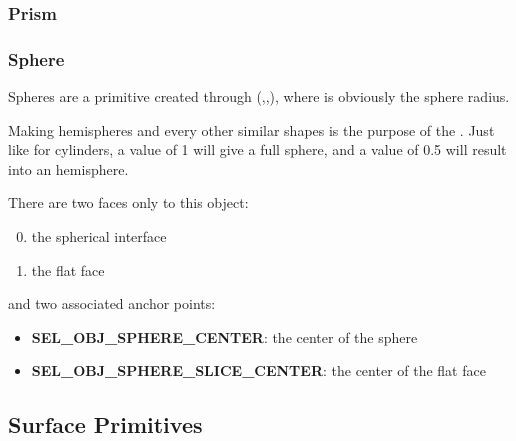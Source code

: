 \newpage
\subsubsection{Prism}

\newpage
\subsubsection{Sphere}

Spheres are a primitive created through (,,), where  is obviously the sphere radius.

Making hemispheres and every other similar shapes is the purpose of the . Just like for cylinders, a value of 1 will give a full sphere, and a value of 0.5 will result into an hemisphere.
\begin{center}\end{center}
There are two faces only to this object:
\begin{enumerate}
\setcounter{enumi}{-1}
	\item the spherical interface
	\item the flat face
\end{enumerate}
and two associated anchor points:
\begin{itemize}
	\item \textbf{SEL\_OBJ\_SPHERE\_CENTER}: the center of the sphere
	\item \textbf{SEL\_OBJ\_SPHERE\_SLICE\_CENTER}: the center of the flat face
\end{itemize}

\newpage
\subsection{Surface Primitives}

